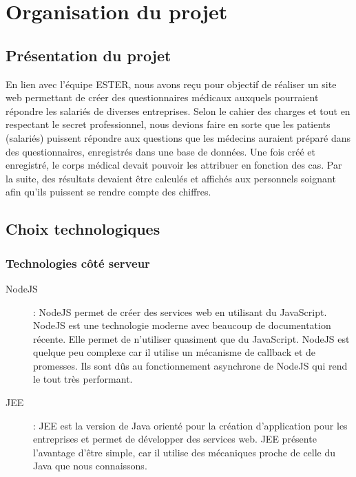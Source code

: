\chapter{Organisation du projet}

\section{Présentation du projet}

En lien avec l'équipe ESTER, nous avons reçu pour objectif de réaliser un site web permettant de créer des questionnaires médicaux auxquels pourraient répondre les salariés de diverses entreprises. Selon le cahier des charges et tout en respectant le secret professionnel, nous devions faire en sorte que les patients (salariés) puissent répondre aux questions que les médecins auraient préparé dans des questionnaires, enregistrés dans une base de données. Une fois créé et enregistré, le corps médical devait pouvoir les attribuer en fonction des cas. Par la suite, des résultats devaient être calculés et affichés aux personnels soignant afin qu'ils puissent se rendre compte des chiffres. 

\section{Choix technologiques}

\subsection{Technologies côté serveur}

\begin{description}

\item[NodeJS] : NodeJS permet de créer des services web en utilisant du JavaScript. 
NodeJS est une technologie moderne avec beaucoup de documentation récente. Elle permet de n'utiliser quasiment que du JavaScript. NodeJS est quelque peu complexe car il utilise un mécanisme de callback et de promesses. Ils sont dûs au fonctionnement asynchrone de NodeJS qui rend le tout très performant.

\item[JEE] : JEE est la version de Java orienté pour la création d'application pour les entreprises et permet de développer des services web.
JEE présente l'avantage d'être simple, car il utilise des mécaniques proche de celle du Java que nous connaissons. 

\end{description}

